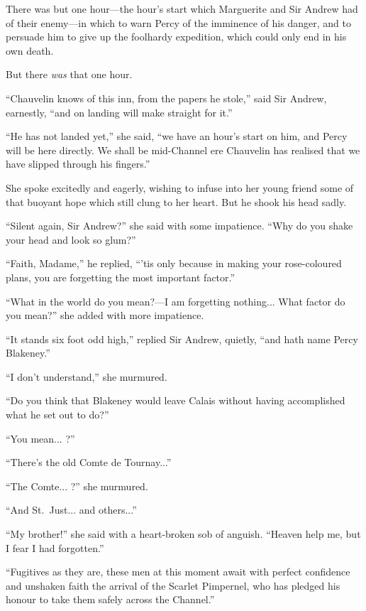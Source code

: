 \documentclass[paper=a5,BCOR=7mm,twoside,DIV=calc,12pt,usegeometry,chapterprefix,endperiod,headings=big]{scrbook}
\begin{document}
There was but one hour---the hour's start which Marguerite and Sir Andrew had of their enemy---in which to warn Percy of the imminence of his danger, and to persuade him to give up the foolhardy expedition, which could only end in his own death.

But there \textit{was} that one hour.

\enquote{Chauvelin knows of this inn, from the papers he stole,} said Sir Andrew, earnestly, \enquote{and on landing will make straight for it.}

\enquote{He has not landed yet,} she said, \enquote{we have an hour's start on him, and Percy will be here directly. We shall be mid-Channel ere Chauvelin has realised that we have slipped through his fingers.}

She spoke excitedly and eagerly, wishing to infuse into her young friend some of that buoyant hope which still clung to her heart. But he shook his head sadly.

\enquote{Silent again, Sir Andrew?} she said with some impatience. \enquote{Why do you shake your head and look so glum?}

\enquote{Faith, Madame,} he replied, \enquote{’tis only because in making your rose-coloured plans, you are forgetting the most important factor.}

\enquote{What in the world do you mean?---I am forgetting nothing... What factor do you mean?} she added with more impatience.

\enquote{It stands six foot odd high,} replied Sir Andrew, quietly, \enquote{and hath name Percy Blakeney.}

\enquote{I don't understand,} she murmured.

\enquote{Do you think that Blakeney would leave Calais without having accomplished what he set out to do?}

\enquote{You mean... ?}

\enquote{There's the old Comte de Tournay...}

\enquote{The Comte... ?} she murmured.

\enquote{And St.~Just... and others...}

\enquote{My brother!} she said with a heart-broken sob of anguish. \enquote{Heaven help me, but I fear I had forgotten.}

\enquote{Fugitives as they are, these men at this moment await with perfect confidence and unshaken faith the arrival of the Scarlet Pimpernel, who has pledged his honour to take them safely across the Channel.}
\end{document}
